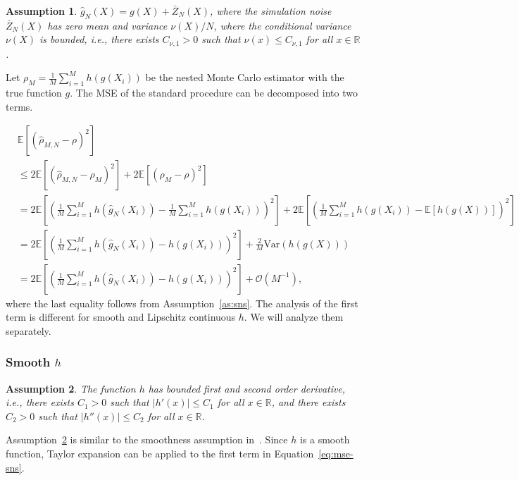 \documentclass{article}
\newtheorem{assumption}{Assumption}
\begin{document}
\begin{assumption} \label{as:sns-noise}
    $\hat{g}_N(X) = g(X) + \bar{Z}_N(X)$, where the simulation noise $\bar{Z}_N(X)$ has zero mean and variance $\nu(X) / N$, where the conditional variance $\nu(X)$ is bounded, i.e., there exists $C_{\nu, 1} > 0$ such that $\nu(x) \leq C_{\nu, 1}$ for all $x \in \mathbb{R}$. 
\end{assumption}

Let $\rho_M = \frac{1}{M} \sum_{i=1}^M h(g(X_i))$ be the nested Monte Carlo estimator with the true function $g$.
The MSE of the standard procedure can be decomposed into two terms.

\begin{align} \label{eq:mse-sns}
    & \mathbb{E} \left[ \left( \hat{\rho}_{M, N} - \rho \right)^2 \right] \nonumber \\
    & \leq 2 \mathbb{E} \left[ \left( \hat{\rho}_{M, N} - \rho_M \right)^2 \right] 
            + 2  \mathbb{E} \left[ \left(\rho_M - \rho \right)^2 \right]  \nonumber \\
    & = 2 \mathbb{E} \left[  \left( \frac{1}{M} \sum_{i=1}^M h\left( \hat{g}_{N}(X_i) \right) -  \frac{1}{M} \sum_{i=1}^M h\left(g(X_i) \right)  \right)^2\right] + 2  \mathbb{E} \left[ \left(\frac{1}{M} \sum_{i=1}^M h\left(g(X_i) \right) - \mathbb{E}\left[ h(g(X))\right] \right)^2 \right]  \nonumber \\
    & = 2 \mathbb{E} \left[  \left( \frac{1}{M} \sum_{i=1}^M h\left( \hat{g}_{N}(X_i) \right) -  h\left(g(X_i) \right)  \right)^2\right] + \frac{2}{M} \text{Var}(h(g(X))) \nonumber \\
    & = 2 \mathbb{E} \left[  \left( \frac{1}{M} \sum_{i=1}^M h\left( \hat{g}_{N}(X_i) \right) -  h\left(g(X_i) \right)  \right)^2\right] + \mathcal{O}(M^{-1}),
\end{align}
where the last equality follows from Assumption~\ref{as:sns}.
The analysis of the first term is different for smooth and Lipschitz continuous $h$. 
We will analyze them separately.

\subsubsection*{Smooth $h$}
\begin{assumption} \label{as:sns-smooth}
    The function $h$ has bounded first and second order derivative, i.e., there exists $C_1 > 0$ such that $|h'(x)| \leq C_1$ for all $x \in \mathbb{R}$, and there exists $C_2 > 0$ such that $|h''(x)| \leq C_2$ for all $x \in \mathbb{R}$.
\end{assumption}
Assumption~\ref{as:sns-smooth} is similar to the smoothness assumption in~\cite{wang2022smooth}.
Since $h$ is a smooth function, Taylor expansion can be applied to the first term in Equation~\ref{eq:mse-sns}.
\end{document}
